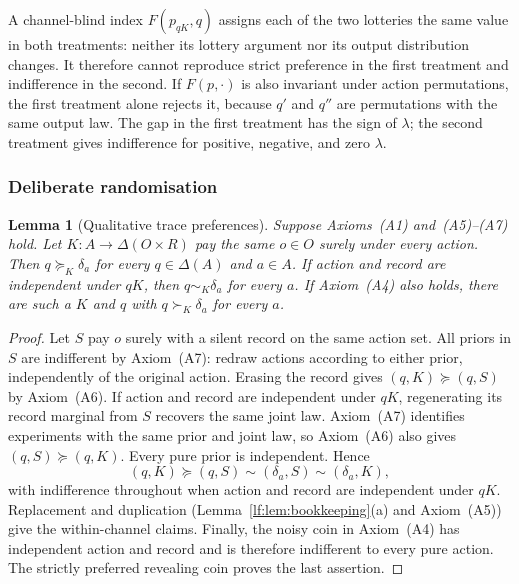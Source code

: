\documentclass[11pt,a4paper]{article}
\newtheorem{lemma}[theorem]{Lemma}
\theoremstyle{definition}
\newcommand{\D}{\Delta}
\newcommand{\1}{\mathbf 1}
\begin{document}
A channel-blind index $F(p_{qK},q)$ assigns each of the two lotteries the
same value in both treatments: neither its lottery argument nor its output
distribution changes.  It therefore cannot reproduce strict preference
in the first treatment and indifference in the second.  If $F(p,\cdot)$
is also invariant under action permutations, the first treatment alone
rejects it, because $q'$ and $q''$ are permutations with the same output law.
The gap in the first treatment has the sign of $\lambda$; the second
treatment gives indifference for positive, negative, and zero $\lambda$.

\subsubsection{Deliberate randomisation}
\label{app:randomisation-proofs}

\begin{lemma}[Qualitative trace preferences]\label{lem:qualitative-trace}
Suppose Axioms~\textup{(A1)} and~\textup{(A5)--(A7)} hold.  Let
$K:A\to\D(O\times R)$ pay the same $o\in O$ surely under every action.
Then $q\succeq_K\delta_a$ for every $q\in\D(A)$ and $a\in A$.
If action and record are independent under $qK$, then
$q\sim_K\delta_a$ for every $a$.  If Axiom~\textup{(A4)} also holds,
there are such a $K$ and $q$ with $q\succ_K\delta_a$ for every $a$.
\end{lemma}

\begin{proof}
Let $S$ pay $o$ surely with a silent record on the same action set.
All priors in $S$ are indifferent by Axiom~\textup{(A7)}: redraw actions
according to either prior, independently of the original action.
Erasing the record gives $(q,K)\succeq(q,S)$ by Axiom~\textup{(A6)}.
If action and record are independent under $qK$, regenerating its record
marginal from $S$ recovers the same joint law.  Axiom~\textup{(A7)}
identifies experiments with the same prior and joint law, so
Axiom~\textup{(A6)} also gives $(q,S)\succeq(q,K)$.
Every pure prior is independent.  Hence
\[
 (q,K)\succeq(q,S)\sim(\delta_a,S)\sim(\delta_a,K),
\]
with indifference throughout when action and record are independent under
$qK$.  Replacement and duplication
(Lemma~\ref{lf:lem:bookkeeping}\textup{(a)} and Axiom~\textup{(A5)})
give the within-channel claims.  Finally, the noisy coin in
Axiom~\textup{(A4)} has independent action and record and is therefore
indifferent to every pure action.  The strictly preferred revealing coin
proves the last assertion.
\end{proof}
\end{document}
